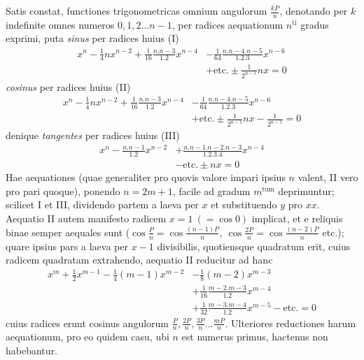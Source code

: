 Satis constat, functiones trigonometricas omnium angulorum \(\frac{kP}n\), denotando per \(k\) indefinite omnes numeros \(0,\allowbreak 1,\allowbreak 2\ldots n-1\), per radices aequationum \(n^{\mathrm{ti}}\) gradus exprimi, puta \textit{sinus} per radices huius (I) \[\begin{aligned}
x^n-\frac14nx^{n-2}+\frac1{16}\frac{n.n-3}{1.2}x^{n-4}
&-\frac1{64}\frac{n.n-4.n-5}{1.2.3}x^{n-6}\\
&+\mathrm{etc.}\pm\frac1{2^{n-1}}nx=0
\end{aligned}\] \textit{cosinus} per radices huius (II) \[\begin{aligned}
x^n-\frac14nx^{n-2}+\frac1{16}\frac{n.n-3}{1.2}x^{n-4}
&-\frac1{64}\frac{n.n-4.n-5}{1.2.3}x^{n-6}\\
&+\mathrm{etc.}\pm\frac1{2^{n-1}}nx-\frac1{2^{n-1}}=0
\end{aligned}\] denique \textit{tangentes} per radices huius (III) \[\begin{aligned}
x^n-\frac{n.n-1}{1.2}x^{n-2}&+\frac{n.n-1.n-2.n-3}{1.2.3.4}x^{n-4}\\
&-\mathrm{etc.}\pm nx=0
\end{aligned}\] Hae aequationes (quae generaliter pro quovis valore impari ipsius \(n\) valent, II vero pro pari quoque), ponendo \(n=2m+1\), facile ad gradum \(m^{\mathrm{tum}}\) deprimuntur; scilicet I et III, dividendo partem a laeva per \(x\) et substituendo \(y\) pro \(xx\). Aequatio II autem manifesto radicem \(x=1\ (=\cos0)\) implicat, et e reliquis binae semper aequales sunt (\(\cos\frac Pn=\cos\frac{(n-1)P}n,\allowbreak \ \cos\frac{2P}n=\cos\frac{(n-2)P}n\) etc.); quare ipsius pars a laeva per \(x-1\) divisibilis, quotiensque quadratum erit, cuius radicem quadratam extrahendo, aequatio II reducitur ad hanc \[\begin{aligned}
x^m+\frac12x^{m-1}-\frac14(m-1)x^{m-2}&-\frac18(m-2)x^{m-3}\\
&+\frac1{16}\frac{m-2.m-3}{1.2}x^{m-4}\\
&+\frac1{32}\frac{m-3.m-4}{1.2}x^{m-5}-\mathrm{etc.}=0
\end{aligned}\] cuius radices erunt cosinus angulorum \(\frac Pn,\allowbreak \frac{2P}n,\allowbreak \frac{3P}n\ldots\frac{mP}n\). Ulteriores reductiones harum aequationum, pro eo quidem casu, ubi \(n\) est numerus primus, hactenus non habebantur.

